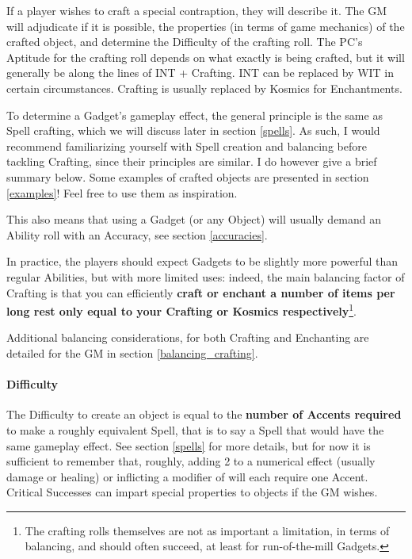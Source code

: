 If a player wishes to craft a special contraption, they will describe it. The GM will adjudicate if it is possible, the properties (in terms of game mechanics) of the crafted object, and determine the Difficulty of the crafting roll. The PC's Aptitude for the crafting roll depends on what exactly is being crafted, but it will generally be along the lines of INT + Crafting. INT can be replaced by WIT in certain circumstances. Crafting is usually replaced by Kosmics for Enchantments.

To determine a Gadget's gameplay effect, the general principle is the same as Spell crafting, which we will discuss later in section \ref{spells}. As such, I would recommend familiarizing yourself with Spell creation and balancing before tackling Crafting, since their principles are similar. I do however give a brief summary below. 
Some examples of crafted objects are presented in section \ref{examples}! Feel free to use them as inspiration.

This also means that using a Gadget (or any Object) will usually demand an Ability roll with an Accuracy, see section \ref{accuracies}.

In practice, the players should expect Gadgets to be slightly more powerful than regular Abilities, but with more limited uses: indeed, the main balancing factor of Crafting is that you can efficiently \textbf{craft or enchant a number of items per long rest only equal to your Crafting or Kosmics respectively}\footnote{The crafting rolls themselves are not as important a limitation, in terms of balancing, and should often succeed, at least for run-of-the-mill Gadgets.}. 


Additional balancing considerations, for both Crafting and Enchanting are detailed for the GM in section \ref{balancing_crafting}.


\paragraph{Difficulty} 

The Difficulty to create an object is equal to the \textbf{number of Accents required} to make a roughly equivalent Spell, that is to say a Spell that would have the same gameplay effect. See section \ref{spells} for more details, but for now it is sufficient to remember that, roughly, adding 2 to a numerical effect (usually damage or healing) or inflicting a modifier of  will each require one Accent. Critical Successes can impart special properties to objects if the GM wishes.

